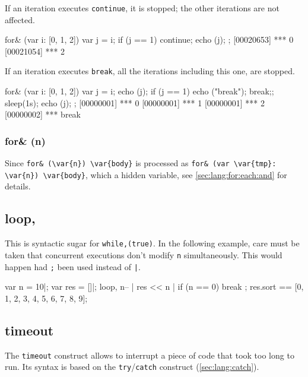 If an iteration executes \lstinline|continue|, it is stopped; the
other iterations are not affected.

\begin{urbiscript}
for& (var i: [0, 1, 2])
{
  var j = i;
  if (j == 1)
    continue;
  echo (j);
};
[00020653] *** 0
[00021054] *** 2
\end{urbiscript}

If an iteration executes \lstinline|break|, all the iterations
including this one, are stopped.

\begin{urbiscript}
for& (var i: [0, 1, 2])
{
  var j = i;
  echo (j);
  if (j == 1)
   { echo ("break");
    break;};
  sleep(1s);
  echo (j);
};
[00000001] *** 0
[00000001] *** 1
[00000001] *** 2
[00000002] *** break
\end{urbiscript}

\subsubsection{for\& (n)}

Since \lstinline|for& (\var{n}) \var{body}| is processed as
\lstinline|for& (var \var{tmp}: \var{n}) \var{body}|, which 
a hidden variable, see \autoref{sec:lang:for:each:and} for details.


\subsection{loop,}
\experimentalremoved{}

This is syntactic sugar for \lstinline|while,(true)|.  In the
following example, care must be taken that concurrent executions don't
modify \lstinline|n| simultaneously.  This would happen had
\lstinline|;| been used instead of \lstinline'|'.

\begin{urbiassert}
{
  var n = 10|;
  var res = []|;
  loop,
  {
    n-- |
    res << n |
    if (n == 0)
      break
  };
  res.sort
}
==
[0, 1, 2, 3, 4, 5, 6, 7, 8, 9];
\end{urbiassert}

\subsection{timeout}
\label{sec:lang:timeout}

The \lstinline|timeout| construct allows to interrupt a piece of code that
took too long to run.  Its syntax is based on the
\lstinline|try|/\lstinline|catch| construct (\autoref{sec:lang:catch}).

